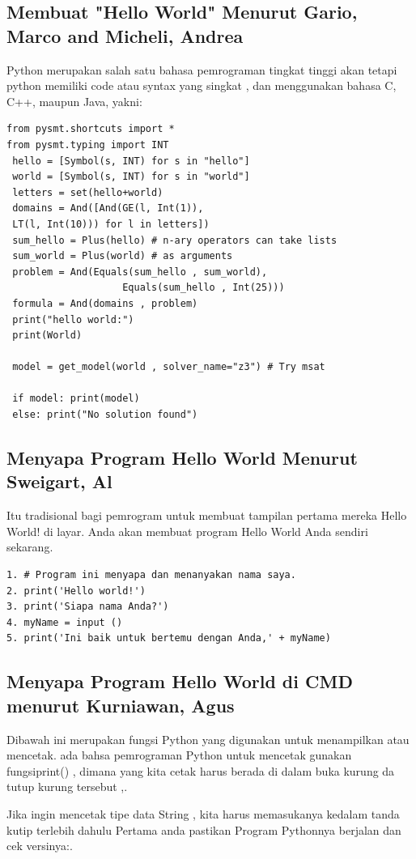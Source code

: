 \documentclass[12pt]{article}
\begin{document}
\subsection{Membuat "Hello World" Menurut Gario, Marco and Micheli, Andrea}
Python merupakan salah satu bahasa pemrograman tingkat tinggi akan tetapi python memiliki code atau syntax yang singkat , dan menggunakan bahasa C, C++, maupun Java, yakni:


\begin{verbatim}
from pysmt.shortcuts import * 
from pysmt.typing import INT 
 hello = [Symbol(s, INT) for s in "hello"] 
 world = [Symbol(s, INT) for s in "world"] 
 letters = set(hello+world) 
 domains = And([And(GE(l, Int(1)), 
 LT(l, Int(10))) for l in letters]) 
 sum_hello = Plus(hello) # n-ary operators can take lists 
 sum_world = Plus(world) # as arguments 
 problem = And(Equals(sum_hello , sum_world),
 					Equals(sum_hello , Int(25))) 
 formula = And(domains , problem) 
 print("hello world:") 
 print(World) 
 
 model = get_model(world , solver_name="z3") # Try msat 
 
 if model: print(model) 
 else: print("No solution found")

\end{verbatim}

\subsection{Menyapa Program Hello World Menurut Sweigart, Al}
Itu tradisional bagi pemrogram untuk membuat tampilan pertama mereka Hello World! di layar. Anda akan membuat program Hello World Anda sendiri sekarang\cite{sweigart2016invent}.
\begin{verbatim}
1. # Program ini menyapa dan menanyakan nama saya.
2. print('Hello world!')
3. print('Siapa nama Anda?')
4. myName = input ()
5. print('Ini baik untuk bertemu dengan Anda,' + myName)
\end{verbatim}

\subsection{Menyapa Program Hello World di CMD menurut Kurniawan, Agus}
Dibawah ini merupakan fungsi Python yang digunakan untuk menampilkan atau mencetak. ada bahsa pemrograman Python untuk mencetak gunakan fungsiprint() , dimana yang kita cetak harus berada di dalam buka kurung da tutup kurung tersebut ,.

Jika ingin mencetak tipe data String , kita harus memasukanya kedalam tanda kutip terlebih dahulu
Pertama anda pastikan Program Pythonnya berjalan dan cek versinya:\cite{kurniawan2016getting}.
\end{document}

